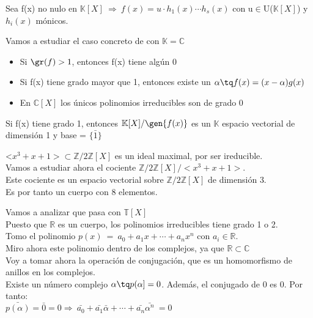 \documentclass[nochap]{apuntes}
\begin{document}
\begin{theorem}
 Sea f(x) no nulo en $\mathbb{K}[X] \ \Rightarrow \ f(x)=u\cdot h_1(x) \cdots h_s(x)$  con u$\in$U($\mathbb{K}[X]$)  y $h_i(x)$  mónicos. 
\end{theorem}

\begin{example}
 Vamos a estudiar el caso concreto de con $\mathbb{K}=\mathbb{C}$\\
 \begin{itemize}
  \item Si $\gr(f)>1$, entonces f(x) tiene algún 0
  \item Si f(x) tiene grado mayor que 1, entonces existe un $\alpha \tq f(x)=(x-\alpha)g(x)$
  \item En $\mathbb{C}[X]$  los únicos polinomios irreducibles son de grado 0
 \end{itemize}
\end{example}

\begin{lemma}
 Si f(x) tiene grado 1, entonces $\mathbb{K}[X]/\gen{f(x)}$  es un $\mathbb{K}$  espacio vectorial de dimensión 1 y base = $\{\bar{1}\}$
\end{lemma}

\begin{example}
 <$x^3+x+1>\subset \mathbb{Z}/2\mathbb{Z}[X]$  es un ideal maximal, por ser ireducible.\\
 Vamos a estudiar ahora el cociente $\mathbb{Z}/2\mathbb{Z}[X]/<x^3+x+1>$.\\
 Este cociente es un espacio vectorial sobre $\mathbb{Z}/2\mathbb{Z}[X]$  de dimensión 3.\\
 Es por tanto un cuerpo con 8 elementos.
\end{example}

Vamos a analizar que pasa con $\mathbb{T}[X]$\\

Puesto que $\mathbb{R}$  es un cuerpo, los polinomios irreducibles tiene grado 1 o 2.\\
Tomo el polinomio $p(x) \ = \ a_0+a_1x+\cdots + a_n x^{n}$  con $a_i\in \mathbb{R}$.\\

Miro ahora este polinomio dentro de los complejos, ya que $\mathbb{R}\subset \mathbb{C}$\\
Voy a tomar ahora la operación de conjugación, que es un homomorfismo de anillos en los complejos.\\

Existe un número complejo $\alpha \tq p(\alpha]=0$. Además, el conjugado de 0 es 0. Por tanto:\\
$\bar{p(\alpha)}=\bar{0}=0 \Rightarrow \ \bar{a_0}+\bar{a_1}\bar{\alpha}+\cdots + \bar{a_n}\bar{\alpha^{n}} \ = 0$\\
\end{document}
